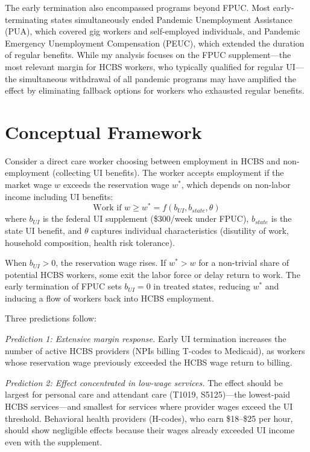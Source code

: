 \documentclass[12pt]{article}
\begin{document}
The early termination also encompassed programs beyond FPUC. Most early-terminating states simultaneously ended Pandemic Unemployment Assistance (PUA), which covered gig workers and self-employed individuals, and Pandemic Emergency Unemployment Compensation (PEUC), which extended the duration of regular benefits. While my analysis focuses on the FPUC supplement---the most relevant margin for HCBS workers, who typically qualified for regular UI---the simultaneous withdrawal of all pandemic programs may have amplified the effect by eliminating fallback options for workers who exhausted regular benefits.


\section{Conceptual Framework}

Consider a direct care worker choosing between employment in HCBS and non-employment (collecting UI benefits). The worker accepts employment if the market wage $w$ exceeds the reservation wage $w^*$, which depends on non-labor income including UI benefits:
\begin{equation}
\text{Work if } w \geq w^* = f(b_{UI}, b_{state}, \theta)
\end{equation}
where $b_{UI}$ is the federal UI supplement (\$300/week under FPUC), $b_{state}$ is the state UI benefit, and $\theta$ captures individual characteristics (disutility of work, household composition, health risk tolerance).

When $b_{UI} > 0$, the reservation wage rises. If $w^* > w$ for a non-trivial share of potential HCBS workers, some exit the labor force or delay return to work. The early termination of FPUC sets $b_{UI} = 0$ in treated states, reducing $w^*$ and inducing a flow of workers back into HCBS employment.

Three predictions follow:

\textit{Prediction 1: Extensive margin response.} Early UI termination increases the number of active HCBS providers (NPIs billing T-codes to Medicaid), as workers whose reservation wage previously exceeded the HCBS wage return to billing.

\textit{Prediction 2: Effect concentrated in low-wage services.} The effect should be largest for personal care and attendant care (T1019, S5125)---the lowest-paid HCBS services---and smallest for services where provider wages exceed the UI threshold. Behavioral health providers (H-codes), who earn \$18--\$25 per hour, should show negligible effects because their wages already exceeded UI income even with the supplement.
\end{document}
